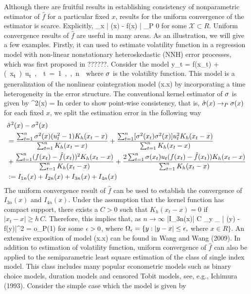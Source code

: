 Although there are fruitful results in establishing consistency of nonparametric estimator of $\hat{f}$ for a particular fixed $x$, results for the uniform convergence of the estimator is scarce. Explicitly,
\bestar
\sup_{x \in {}} | (x) - f(x) | \to_P 0
\eestar
for some $\mathcal{X} \subset R$. Uniform convergence results of $\hat{f}$ are useful in many areas. As an illustration, we will give a few examples. Firstly, it can used to estimate volatility function in a regression model with non-linear nonstationary heteroskedastic (NNH) error processes, which was first proposed in ??????. Consider the model
\bestar
y_t = f(x_t) + \si(x_t) u_t, \quad t = 1, ..., n
\eestar
where $\sigma$ is the volatility function. This model is a generalization of the nonlinear cointegration model (x.x) by incorporating a time heterogeneity in the error structure. The conventional kernel estimator of $\sigma$ is given by
\bestar
\hat{\si}^2(x) = 
\eestar
In order to show point-wise consistency, that is, $\hat{\sigma}(x) \to_P \sigma(x)$ for each fixed $x$, we split the estimation error in the following way
\begin{align}
&\hat{\sigma}^2(x) - \sigma^2(x) \nonumber\\
&=\frac{\sum_{t = 1}^n \sigma^2(x) (u_t^2 - 1) K_h(x_t - x)}{\sum_{t = 1}^n K_h(x_t - x)} + \frac{\sum_{t = 1}^n [\sigma^2(x_t) \sigma^2(x) ] u_t^2 K_h(x_t - x)}{\sum_{t = 1}^n K_h(x_t - x)} \nonumber\\
&+\frac{\sum_{t = 1}^n (f(x_t) - \hat{f}(x_t))^2 K_h(x_t - x)}{\sum_{t = 1}^n K_h(x_t - x)} + \frac{2\sum_{t = 1}^n \sigma(x_t) u_t (f(x_t) - \hat{f}(x_t))  K_h(x_t - x)}{\sum_{t = 1}^n K_h(x_t - x)} \nonumber\\
&:= I_{1n}(x) + I_{2n}(x) + I_{3n}(x) + I_{4n}(x) \nonumber
\end{align}
The uniform convergence result of $\hat{f}$ can be used to establish the convergence of $I_{3n}(x)$ and $I_{4n}(x)$. Under the assumption that the kernel function has compact support, there exists a $C > 0$ such that $K_h(x_t - x) = 0$ if $|x_t - x| \ge h\,C$. Therefore, this implies that, as $n\to \infty$
\bestar
|I_{3n}(x)| \le C  \sup_{y \in \Omega_\ep} | (y) - f(y)|^2 = o_P(1)
\eestar
for some $\epsilon > 0$, where $\Omega_\epsilon = \{y : |y - x | \le \epsilon, $ where $ x \in R\}$. An extensive exposition of model (x.x) can be found in Wang and Wang (2009). In addition to estimation of volatility function, uniform convergence of $\hat{f}$ can also be applied to the semiparametric least square estimation of the class of single index model. This class includes many popular econometric models such as binary choice models, duration models and censored Tobit models, see, e.g., Ichimura (1993). Consider the simple case which the model is given by
